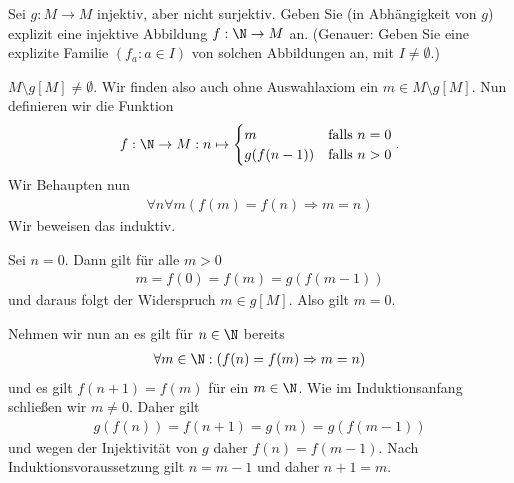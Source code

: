 
\begin{exercise}[270]

Sei $g: M \to M$ injektiv, aber nicht surjektiv. Geben Sie (in Abhängigkeit von $g$)
explizit eine injektive Abbildung $f: \N \to M$ an.
(Genauer: Geben Sie eine explizite Familie $(f_a: a \in I)$ von solchen Abbildungen
an, mit $I \neq \emptyset$.)

\end{exercise}


\begin{solution}

$M \setminus g[M] \neq \emptyset$. Wir finden also auch ohne Auswahlaxiom ein $m \in M \setminus g[M]$. Nun definieren wir die Funktion
\begin{align*}
	f: \N \to M: n \mapsto
	\begin{cases}
		m & \text{falls } n = 0 \\
		g(f(n - 1)) & \text{falls } n > 0 
	\end{cases}.
\end{align*}
Wir Behaupten nun
\begin{align*}
	\forall n \forall m (f(m) = f(n) \Rightarrow m = n)
\end{align*}
Wir beweisen das induktiv.

Sei $n = 0$. Dann gilt für alle $m > 0$
\begin{align*}
	m = f(0) = f(m) = g(f(m - 1))
\end{align*}
und daraus folgt der Widerspruch $m \in g[M]$. Also gilt $m = 0$. 

Nehmen wir nun an es gilt für $n \in \N$ bereits 
\begin{align*}
	\forall m \in \N: (f(n) = f(m) \Rightarrow m = n)
\end{align*}
und es gilt $f(n + 1) = f(m)$ für ein $m \in \N$. Wie im Induktionsanfang schließen wir $m \neq 0$. Daher gilt
\begin{align*}
	g(f(n)) = f(n + 1) = g(m) = g(f(m - 1))
\end{align*}
und wegen der Injektivität von $g$ daher $f(n) = f(m - 1)$. Nach Induktionsvoraussetzung gilt $n = m - 1$ und daher $n + 1 = m$. 

\end{solution}
